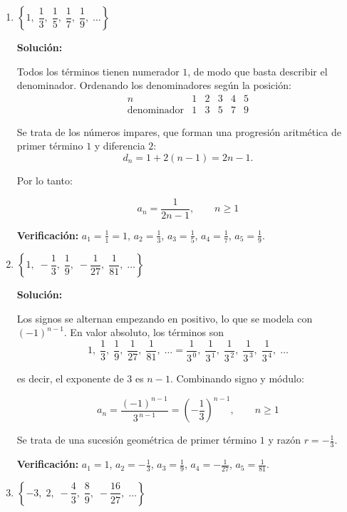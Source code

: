 \documentclass[12pt]{article}
\newcommand{\solucion}{%
    \vspace{0.8em}%
    \textbf{Solución:}%
}
\begin{document}
\begin{enumerate}[label=\alph*.-]

    \item $\left\{1,\;\dfrac13,\;\dfrac15,\;\dfrac17,\;\dfrac19,\;\dots\right\}$

    \solucion

    Todos los términos tienen numerador $1$, de modo que basta describir el
    denominador. Ordenando los denominadores según la posición:
    \[
    \begin{array}{c|ccccc}
    n           & 1 & 2 & 3 & 4 & 5\\\hline
    \text{denominador} & 1 & 3 & 5 & 7 & 9
    \end{array}
    \]

    Se trata de los números impares, que forman una progresión aritmética de
    primer término $1$ y diferencia $2$:
    \[
    d_n=1+2(n-1)=2n-1 .
    \]

    Por lo tanto:

    \[
    \boxed{
    a_n=\frac{1}{2n-1},\qquad n\ge 1
    }
    \]

    \textbf{Verificación:}
    $a_1=\frac11=1$, $a_2=\frac13$, $a_3=\frac15$, $a_4=\frac17$,
    $a_5=\frac19$.

    \item $\left\{1,\;-\dfrac13,\;\dfrac19,\;-\dfrac{1}{27},\;\dfrac{1}{81},
    \;\dots\right\}$

    \solucion

    Los signos se alternan empezando en positivo, lo que se modela con
    $(-1)^{n-1}$. En valor absoluto, los términos son
    \[
    1,\;\frac13,\;\frac19,\;\frac{1}{27},\;\frac{1}{81},\;\dots
    =\frac{1}{3^{\,0}},\;\frac{1}{3^{\,1}},\;\frac{1}{3^{\,2}},
     \;\frac{1}{3^{\,3}},\;\frac{1}{3^{\,4}},\;\dots
    \]

    es decir, el exponente de $3$ es $n-1$. Combinando signo y módulo:

    \[
    \boxed{
    a_n=\frac{(-1)^{n-1}}{3^{\,n-1}}=\left(-\frac13\right)^{n-1},
    \qquad n\ge 1
    }
    \]

    Se trata de una sucesión geométrica de primer término $1$ y razón
    $r=-\frac13$.

    \textbf{Verificación:}
    $a_1=1$, $a_2=-\frac13$, $a_3=\frac19$, $a_4=-\frac{1}{27}$,
    $a_5=\frac{1}{81}$.

    \item $\left\{-3,\;2,\;-\dfrac43,\;\dfrac89,\;-\dfrac{16}{27},\;\dots\right\}$


\end{enumerate}
\end{document}
